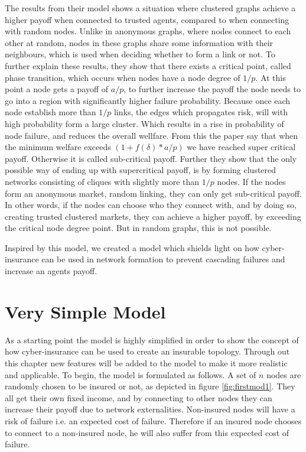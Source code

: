 The results from their model shows a situation where clustered graphs achieve a higher payoff when connected to trusted agents, compared to when connecting with random nodes. Unlike in anonymous graphs, where nodes connect to each other at random, nodes in these graphs share some information with their neighbours, which is used when deciding whether to form a link or not. 
To further explain these results, they show that there exists a critical point, called phase transition, which occurs when nodes have a node degree of $1/p$. 
At this point a node gets a payoff of $a/p$, to further increase the payoff the node needs to go into a region with significantly higher failure probability. 
Because once each node establish more than $1/p$ links, the edges which propagates risk, will with high probability form a large cluster. Which results in a rise in probability of node failure, and reduces the overall wellfare.
From this the paper say that when the minimum welfare exceeds 
$(1+f(\delta)*a/p)$
we have reached super critical payoff. Otherwise it is called sub-critical payoff. 
Further they show that the only possible way of ending up with supercritical payoff, is by forming clustered networks consisting of cliques with slightly more than $1/p$ nodes. 
If the nodes form an anonymous market, random linking, they can only get sub-critical payoff. 
In other words, if the nodes can choose who they connect with, and by doing so, creating trusted clustered markets, they can achieve a higher payoff, by exceeding the critical node degree point. But in random graphs, this is not possible. 


Inspired by this model, we created a model which shields light on how cyber-insurance can be used in network formation to prevent cascading failures and increase an agents payoff.  



\section{Very Simple Model \label{section:verysimplemodel}}

As a starting point the model is highly simplified in order to show the concept of how cyber-insurance can be used to create an insurable topology. Through out this chapter new features will be added to the model to make it more realistic and applicable. To begin, the model is formulated as follows.
A set of $n$ nodes are randomly chosen to be insured or not, as depicted in figure \ref{fig:firstmod1}. They all get their own fixed income, and by connecting to other nodes they can increase their payoff due to network externalities. Non-insured nodes will have a risk of failure i.e. an expected cost of failure. Therefore if an insured node chooses to connect to a non-insured node, he will also suffer from this expected cost of failure. 

